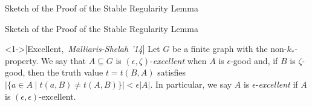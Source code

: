 \documentclass{beamer}
\newcommand{\parcurly}[1]{\{ #1 \}}
\newcommand{\parstraight}[1]{| #1 |}
\begin{document}
\begin{frame}{Sketch of the Proof of the Stable Regularity Lemma}
\begin{center}
{}
    \end{center}
\end{frame}

\begin{frame}{Sketch of the Proof of the Stable Regularity Lemma}
    \begin{definition}<1->[Excellent,~\textit{Malliaris-Shelah '14}] \label{def:epsilon_excellent}
        Let $G$ be a finite graph with the non-$k_*$-property.
        We say that $A \subseteq G$ is $(\epsilon, \zeta)$-\emph{excellent} when $A$ is $\epsilon$-good and, if $B$ is
        $\zeta$-good, then the truth value $t = t(B,A)$ satisfies $\parstraight{\parcurly{a \in A \mid t(a,B) \neq t(A,B)}} < \epsilon |A|$.
        In particular, we say $A$ is $\epsilon$-\emph{excellent} if $A$ is $(\epsilon, \epsilon)$-excellent.
    \end{definition}


\end{frame}
\end{document}
